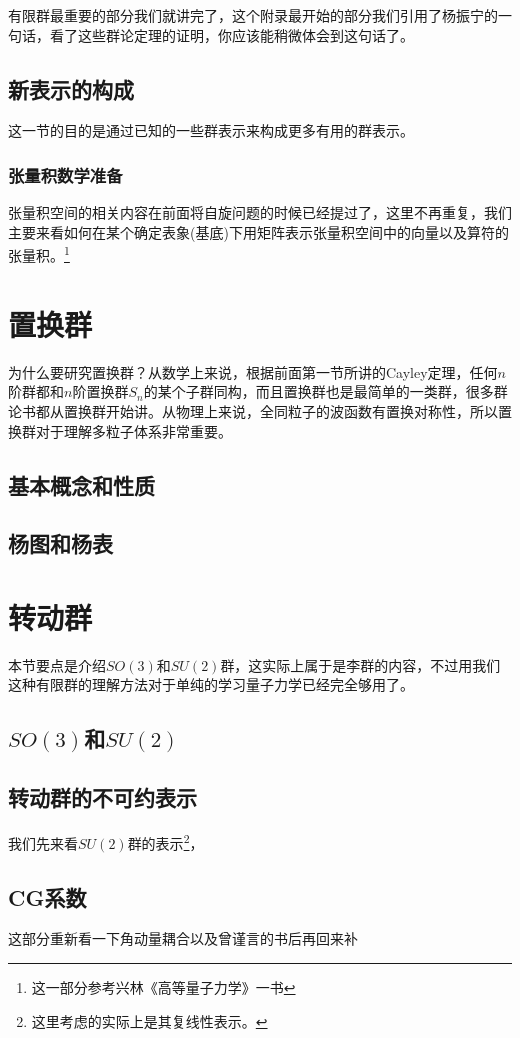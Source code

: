 有限群最重要的部分我们就讲完了，这个附录最开始的部分我们引用了杨振宁的一句话，看了这些群论定理的证明，你应该能稍微体会到这句话了。

\subsection{新表示的构成}
这一节的目的是通过已知的一些群表示来构成更多有用的群表示。

\subsubsection{张量积数学准备}
张量积空间的相关内容在前面将自旋问题的时候已经提过了，这里不再重复，我们主要来看如何在某个确定表象(基底)下用矩阵表示张量积空间中的向量以及算符的张量积。\footnote{这一部分参考兴林《高等量子力学》一书}



\section{置换群}
为什么要研究置换群？从数学上来说，根据前面第一节所讲的Cayley定理，任何$n$阶群都和$n$阶置换群$S_n$的某个子群同构，而且置换群也是最简单的一类群，很多群论书都从置换群开始讲。从物理上来说，全同粒子的波函数有置换对称性，所以置换群对于理解多粒子体系非常重要。
\subsection{基本概念和性质}

\subsection{杨图和杨表}

\section{转动群}
本节要点是介绍$SO(3)$和$SU(2)$群，这实际上属于是李群的内容，不过用我们这种有限群的理解方法对于单纯的学习量子力学已经完全够用了。
\subsection{$SO(3)$和$SU(2)$}


\subsection{转动群的不可约表示}
我们先来看$SU(2)$群的表示\footnote{这里考虑的实际上是其复线性表示。}，

\subsection{CG系数}
这部分重新看一下角动量耦合以及曾谨言的书后再回来补